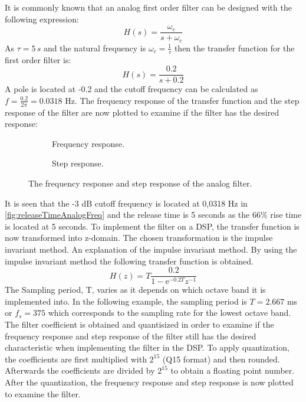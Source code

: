 It is commonly known that an analog first order filter can be designed with the following expression:
\begin{equation}
H(s) = \frac{\omega_c}{s+\omega_c}
\end{equation}
As $\tau = 5\, s$ and the natural frequency is $\omega_c = \frac{1}{\tau}$ then the transfer function for the first order filter is:
\begin{equation}
H(s) = \frac{0.2}{s+0.2}
\end{equation} 
A pole is located at -0.2 and the cutoff frequency can be calculated as $f = \frac{0.2}{2\pi} = 0.0318 \text{ Hz}$. The frequency response of the transfer function and the step response of the filter are now plotted to examine if the filter has the desired response:

\begin{figure}[H]
\centering
\begin{subfigure}[t]{0.45\textwidth}
	
	\caption{Frequency response.}
	\label{fig:releaseTimeAnalogFreq}
\end{subfigure}
\hfill
\begin{subfigure}[t]{0.45\textwidth}
	
	\caption{Step response.}
	\label{fig:releaseTimeAnalogStep}
\end{subfigure}
\caption{The frequency response and step response of the analog filter.}
\label{fig:releaseTimeAnalog}
\end{figure}

It is seen that the -3 dB cutoff frequency is located at 0,0318 Hz in \autoref{fig:releaseTimeAnalogFreq} and the release time is 5 seconds as the 66\% rise time is located at 5 seconds. To implement the filter on a DSP, the transfer function is now transformed into z-domain. The chosen transformation is the impulse invariant method. An explanation of the impulse invariant method. By using the impulse invariant method the following transfer function is obtained.
\begin{equation} \label{eq:releaseTF}
H(z) = T\frac{0.2}{1-\text{e}^{-0.2T} z^{-1}}
\end{equation} 
The Sampling period, T, varies as it depends on which octave band it is implemented into. In the following example, the sampling period is $T = 2.667$ ms or $f_s = 375$ which corresponds to the sampling rate for the lowest octave band. The filter coefficient is obtained and quantisized in order to examine if the frequency response and step response of the filter still has the desired characteristic when implementing the filter in the DSP. To apply quantization, the coefficients are first multiplied with $2^{15}$ (Q15 format) and then rounded. Afterwards the coefficients are divided by $2^{15}$ to obtain a floating point number. After the quantization, the frequency response and step response is now plotted to examine the filter.

